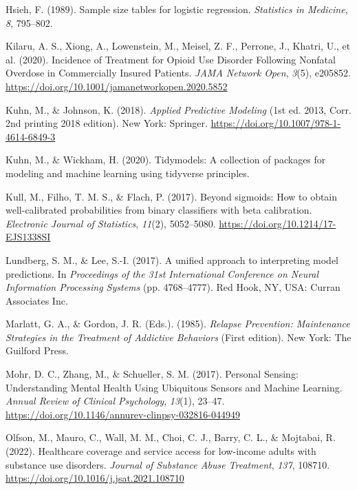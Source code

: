 \documentclass[
]{agujournal2019}
\newlength{\cslhangindent}
\newenvironment{CSLReferences}[2] %
 {\begin{list}{}{%
  \setlength{\itemindent}{0pt}
  \setlength{\leftmargin}{0pt}
  \setlength{\parsep}{0pt}
  \ifodd #1
   \setlength{\leftmargin}{\cslhangindent}
   \setlength{\itemindent}{-1\cslhangindent}
  \fi
  \setlength{\itemsep}{#2\baselineskip}}}
 {\end{list}}
\begin{document}
\begin{CSLReferences}{1}{0}
Hsieh, F. (1989). Sample size tables for logistic regression.
\emph{Statistics in Medicine}, \emph{8}, 795--802.

Kilaru, A. S., Xiong, A., Lowenstein, M., Meisel, Z. F., Perrone, J.,
Khatri, U., et al. (2020). Incidence of {Treatment} for {Opioid Use
Disorder Following Nonfatal Overdose} in {Commercially Insured
Patients}. \emph{JAMA Network Open}, \emph{3}(5), e205852.
\url{https://doi.org/10.1001/jamanetworkopen.2020.5852}

Kuhn, M., \& Johnson, K. (2018). \emph{Applied {Predictive Modeling}}
(1st ed. 2013, Corr. 2nd printing 2018 edition). New York: Springer.
\url{https://doi.org/10.1007/978-1-4614-6849-3}

Kuhn, M., \& Wickham, H. (2020). Tidymodels: A collection of packages
for modeling and machine learning using tidyverse principles.

Kull, M., Filho, T. M. S., \& Flach, P. (2017). Beyond sigmoids: {How}
to obtain well-calibrated probabilities from binary classifiers with
beta calibration. \emph{Electronic Journal of Statistics}, \emph{11}(2),
5052--5080. \url{https://doi.org/10.1214/17-EJS1338SI}

Lundberg, S. M., \& Lee, S.-I. (2017). A unified approach to
interpreting model predictions. In \emph{Proceedings of the 31st
{International Conference} on {Neural Information Processing Systems}}
(pp. 4768--4777). Red Hook, NY, USA: Curran Associates Inc.

Marlatt, G. A., \& Gordon, J. R. (Eds.). (1985). \emph{Relapse
{Prevention}: {Maintenance Strategies} in the {Treatment} of {Addictive
Behaviors}} (First edition). New York: The Guilford Press.

Mohr, D. C., Zhang, M., \& Schueller, S. M. (2017). Personal {Sensing}:
{Understanding Mental Health Using Ubiquitous Sensors} and {Machine
Learning}. \emph{Annual Review of Clinical Psychology}, \emph{13}(1),
23--47. \url{https://doi.org/10.1146/annurev-clinpsy-032816-044949}

Olfson, M., Mauro, C., Wall, M. M., Choi, C. J., Barry, C. L., \&
Mojtabai, R. (2022). Healthcare coverage and service access for
low-income adults with substance use disorders. \emph{Journal of
Substance Abuse Treatment}, \emph{137}, 108710.
\url{https://doi.org/10.1016/j.jsat.2021.108710}


\end{CSLReferences}
\end{document}
